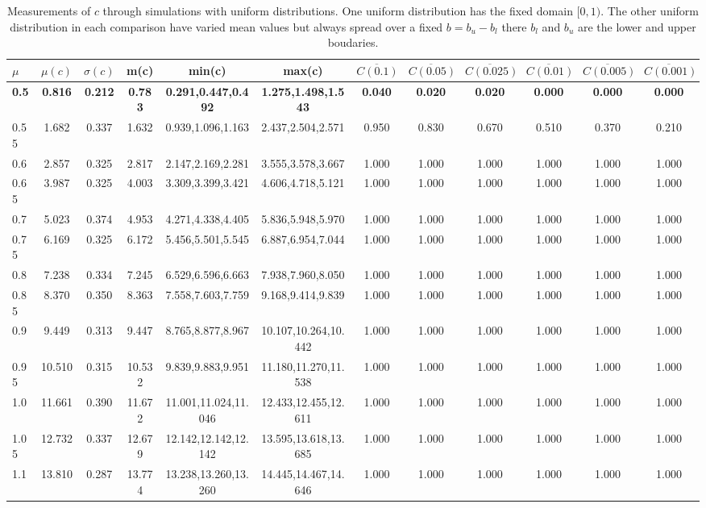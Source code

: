 \begin{table*}[h!]
\begin{center}
\begin{tabular}{| l | c | c | c | c | c | c | c | c | c | c | c |}\hline
$\mu$ & $\mu(c)$ & $\sigma(c)$ & m(c) & min(c) & max(c) & $\overline{C(0.1)}$ & $\overline{C(0.05)}$ & $\overline{C(0.025)}$ & $\overline{C(0.01)}$ & $\overline{C(0.005)}$ & $\overline{C(0.001)}$ \\\hline\hline
{\bf 0.5} & {\bf 0.816} & {\bf 0.212} & {\bf 0.783} & {\bf 0.291,0.447,0.492} & {\bf 1.275,1.498,1.543} & {\bf 0.040} & {\bf 0.020} & {\bf 0.020} & {\bf 0.000} & {\bf 0.000} & {\bf 0.000} \\\hline
0.55 & 1.682 & 0.337 & 1.632 & 0.939,1.096,1.163 & 2.437,2.504,2.571  & 0.950  & 0.830  & 0.670  & 0.510  & 0.370  & 0.210 \\\hline
0.6 & 2.857 & 0.325 & 2.817 & 2.147,2.169,2.281 & 3.555,3.578,3.667  & 1.000  & 1.000  & 1.000  & 1.000  & 1.000  & 1.000 \\\hline
0.65 & 3.987 & 0.325 & 4.003 & 3.309,3.399,3.421 & 4.606,4.718,5.121  & 1.000  & 1.000  & 1.000  & 1.000  & 1.000  & 1.000 \\\hline
0.7 & 5.023 & 0.374 & 4.953 & 4.271,4.338,4.405 & 5.836,5.948,5.970  & 1.000  & 1.000  & 1.000  & 1.000  & 1.000  & 1.000 \\\hline
0.75 & 6.169 & 0.325 & 6.172 & 5.456,5.501,5.545 & 6.887,6.954,7.044  & 1.000  & 1.000  & 1.000  & 1.000  & 1.000  & 1.000 \\\hline
0.8 & 7.238 & 0.334 & 7.245 & 6.529,6.596,6.663 & 7.938,7.960,8.050  & 1.000  & 1.000  & 1.000  & 1.000  & 1.000  & 1.000 \\\hline
0.85 & 8.370 & 0.350 & 8.363 & 7.558,7.603,7.759 & 9.168,9.414,9.839  & 1.000  & 1.000  & 1.000  & 1.000  & 1.000  & 1.000 \\\hline
0.9 & 9.449 & 0.313 & 9.447 & 8.765,8.877,8.967 & 10.107,10.264,10.442  & 1.000  & 1.000  & 1.000  & 1.000  & 1.000  & 1.000 \\\hline
0.95 & 10.510 & 0.315 & 10.532 & 9.839,9.883,9.951 & 11.180,11.270,11.538  & 1.000  & 1.000  & 1.000  & 1.000  & 1.000  & 1.000 \\\hline
1.0 & 11.661 & 0.390 & 11.672 & 11.001,11.024,11.046 & 12.433,12.455,12.611  & 1.000  & 1.000  & 1.000  & 1.000  & 1.000  & 1.000 \\\hline
1.05 & 12.732 & 0.337 & 12.679 & 12.142,12.142,12.142 & 13.595,13.618,13.685  & 1.000  & 1.000  & 1.000  & 1.000  & 1.000  & 1.000 \\\hline
1.1 & 13.810 & 0.287 & 13.774 & 13.238,13.260,13.260 & 14.445,14.467,14.646  & 1.000  & 1.000  & 1.000  & 1.000  & 1.000  & 1.000 \\\hline
\end{tabular}
\caption{Measurements of $c$ through simulations
        with uniform distributions.
        One uniform distribution has the fixed domain $[0,1)$.
        The other uniform distribution in each comparison
        have varied mean values but always
        spread over a fixed $b=b_u-b_l$ there $b_l$ and $b_u$ are the lower and upper boudaries.}
\end{center}
\end{table*}